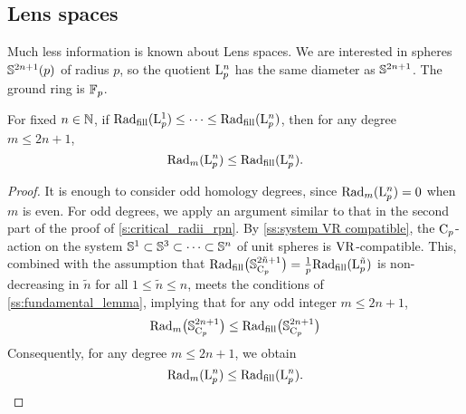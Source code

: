 \subsection{Lens spaces}\label{s:critical_radii_lens}

Much less information is known about Lens spaces.
We are interested in spheres \(\mathbb{S}^{2n+1}(p)\) of radius \(p\), so the quotient \(\mathrm{L}_p^n\) has the same diameter as \(\mathbb{S}^{2n+1}\).
The ground ring is \({\mathbb{F}_p}\).

\lemma
For fixed $n\in \mathbb{N}$, if $\mathrm{Rad}_{\mathrm{fill}}(\mathrm{L}^1_p) \leq \dotsb \leq \mathrm{Rad}_{\mathrm{fill}}(\mathrm{L}^n_p)$, then for any degree $m\leq 2n+1$,
\[
\mathrm{Rad}_{m}(\mathrm{L}^n_p) \leq \mathrm{Rad}_{\mathrm{fill}}(\mathrm{L}^n_p).
\]

\begin{proof}
    It is enough to consider odd homology degrees, since $\mathrm{Rad}_{m}(\mathrm{L}^n_p) = 0$ when $m$ is even.
    For odd degrees, we apply an argument similar to that in the second part of the proof of \cref{s:critical_radii_rpn}.
    By \cref{ss:system VR compatible}, the $\mathrm{C}_p$-action on the system $\mathbb{S}^1 \subset \mathbb{S}^3 \subset \dotsb \subset \mathbb{S}^n$ of unit spheres is \(\mathrm{VR}\)-compatible.
    This, combined with the assumption that $\mathrm{Rad}_{\mathrm{fill}}\big(\mathbb{S}^{2\tilde{n}+1}_{\mathrm{C}_p}\big) = \tfrac{1}{p} \mathrm{Rad}_{\mathrm{fill}}(\mathrm{L}^{\tilde{n}}_p)$ is non-decreasing in $\tilde{n}$ for all $1\leq \tilde{n} \leq n$, meets the conditions of \cref{ss:fundamental_lemma}, implying that for any odd integer $m \leq 2n+1$,
    \[
    \mathrm{Rad}_m\big(\mathbb{S}^{2n+1}_{\mathrm{C}_p}\big) \leq \mathrm{Rad}_{\mathrm{fill}}\big(\mathbb{S}^{2n+1}_{\mathrm{C}_p}\big)
    \]
    Consequently, for any degree $m \leq 2n+1$, we obtain
    \[
    \mathrm{Rad}_{m}(\mathrm{L}^n_p) \leq \mathrm{Rad}_{\mathrm{fill}}(\mathrm{L}^n_p). \qedhere
    \]
\end{proof}